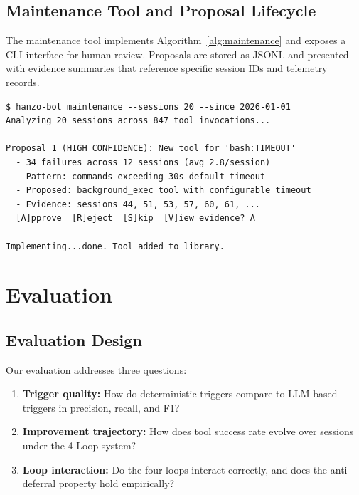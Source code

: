 \documentclass[11pt]{article}
\begin{document}
\subsection{Maintenance Tool and Proposal Lifecycle}

The maintenance tool implements Algorithm~\ref{alg:maintenance} and exposes
a CLI interface for human review. Proposals are stored as JSONL and presented
with evidence summaries that reference specific session IDs and telemetry records.

\begin{verbatim}
$ hanzo-bot maintenance --sessions 20 --since 2026-01-01
Analyzing 20 sessions across 847 tool invocations...

Proposal 1 (HIGH CONFIDENCE): New tool for 'bash:TIMEOUT'
  - 34 failures across 12 sessions (avg 2.8/session)
  - Pattern: commands exceeding 30s default timeout
  - Proposed: background_exec tool with configurable timeout
  - Evidence: sessions 44, 51, 53, 57, 60, 61, ...
  [A]pprove  [R]eject  [S]kip  [V]iew evidence? A

Implementing...done. Tool added to library.
\end{verbatim}

\section{Evaluation}
\label{sec:evaluation}

\subsection{Evaluation Design}

Our evaluation addresses three questions:

\begin{enumerate}[leftmargin=1.5em]
    \item \textbf{Trigger quality:} How do deterministic triggers compare to
          LLM-based triggers in precision, recall, and F1?

    \item \textbf{Improvement trajectory:} How does tool success rate evolve
          over sessions under the 4-Loop system?

    \item \textbf{Loop interaction:} Do the four loops interact correctly, and
          does the anti-deferral property hold empirically?
\end{enumerate}
\end{document}

